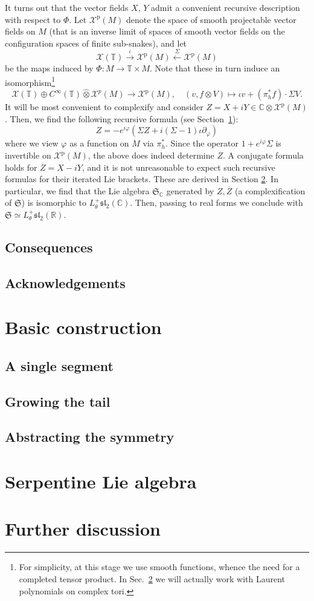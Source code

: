 \documentclass{article}
\def\fsl{\mathfrak{sl}}
\def\fS{\mathfrak{S}}
\def\RR{\mathbb{R}}
\def\CC{\mathbb{C}}
\def\TT{\mathbb{T}}
\def\XX{\mathcal{X}}
\def\p{\mathrm{p}}
\begin{document}
It turns out that the vector fields $X$, $Y$ admit a convenient recursive
description with respect to $\Phi$. Let $\XX^\p(M)$ denote the space of
smooth projectable vector fields on $M$ (that is an inverse limit of 
spaces of smooth vector fields on the configuration spaces of finite sub-snakes),
and let
$$ \XX(\TT) \xrightarrow{\iota} \XX^\p(M) \xleftarrow{\Sigma} \XX^\p(M) $$
be the maps induced by $\Phi : M \to \TT\times M$. Note that these in turn induce
an isomorphism\footnote{For simplicity, at this stage we use
smooth functions, whence the need for a completed tensor product.
In Sec.~\ref{sec:algebra} we will actually 
work with Laurent polynomials on complex tori.}
$$
\XX(\TT) \oplus C^\infty(\TT) \widehat\otimes \XX^p(M) \to \XX^\p(M),
\quad
(v, f \otimes V) \mapsto \iota v + (\pi_h^* f)\cdot \Sigma V.
$$
It will be most convenient to complexify and consider
$Z = X+iY \in \CC\otimes\XX^\p(M)$.
Then, we find the following recursive formula (see Section~\ref{sec:basic}):
$$
Z = -e^{i\varphi} \left( 
        \Sigma Z + i(\Sigma-1)\iota\partial_\varphi
\right)$$
where we view $\varphi$ as a function on $M$ via $\pi_h^*$.
Since the operator $1+e^{i\varphi}\Sigma$ 
is invertible on $\XX^\p(M)$, the above does indeed determine $Z$. A
conjugate formula holds for $\overline Z = X - iY$, and it is not unreasonable
to expect such recursive formulas for their iterated Lie brackets.
These are derived in Section \ref{sec:algebra}. In particular,
we find that the Lie algebra $\fS_\CC$ generated by $Z, \overline Z$
(a complexification of $\fS$) is isomorphic to $L_\theta^+\fsl_2(\CC)$.
Then, passing to real forms we conclude with $\fS\simeq L_\theta^+\fsl_2(\RR)$.


\subsection{Consequences}

\subsection{Acknowledgements}


\section{Basic construction}
\label{sec:basic}
\subsection{A single segment}

\subsection{Growing the tail}

\subsection{Abstracting the symmetry}

\section{Serpentine Lie algebra}
\label{sec:algebra}
\section{Further discussion}
\label{sec:further}
\end{document}
